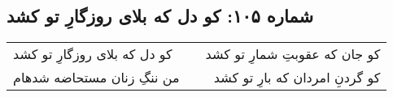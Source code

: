\begin{center}
\section*{شماره ۱۰۵: کو دل که بلای روزگارِ تو کشد}
\label{sec:105}
\begin{longtable}{l p{0.5cm} r}
کو دل که بلای روزگارِ تو کشد
&&
کو جان که عقوبتِ شمارِ تو کشد
\\
من ننگِ زنان مستحاضه شدهام
&&
کو گردنِ امردان که بارِ تو کشد
\\
\end{longtable}
\end{center}
